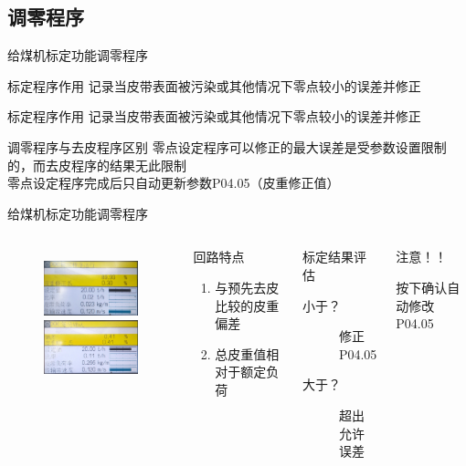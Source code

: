 \documentclass[12pt,hyperref={CJKbookmarks=true}]{beamer} %
\begin{document}
\subsection{调零程序}
\begin{frame}{给煤机标定功能}{调零程序}
  		\begin{block}{标定程序作用}
  		记录当皮带表面被污染或其他情况下零点较小的误差并修正
\end{block}
	\begin{block}{标定程序作用}
  		记录当皮带表面被污染或其他情况下零点较小的误差并修正
\end{block}
\begin{block}{调零程序与去皮程序区别}
  		零点设定程序可以修正的最大误差是受参数设置限制的，而去皮程序的结果无此限制\\
零点设定程序完成后只自动更新参数P04.05（皮重修正值）
\end{block}
	\end{frame}
	\begin{frame}{给煤机标定功能}{调零程序}
  		\begin{columns}
\begin{figure}
\includegraphics[angle=0,width=150pt,trim=0 0 0 0,clip]{picture/zeroing.jpg}\\
\includegraphics[angle=0,width=150pt,trim=0 0 0 0,clip]{picture/zeroed.jpg}
	
\end{figure}
\begin{block}{回路特点}
			\begin{enumerate}
				\item  与预先去皮比较的皮重偏差
				\item  总皮重值相对于额定负荷
				\end{enumerate}
\end{block}
\begin{exampleblock}{标定结果评估}
			\begin{description}
				\item[小于？]修正P04.05
				\item[大于？]超出允许误差
				\end{description}
\end{exampleblock}
\begin{alertblock}{注意！！}
			
				按下确认自动修改P04.05
\end{alertblock}
		\end{columns}
	\end{frame}
\end{document}
